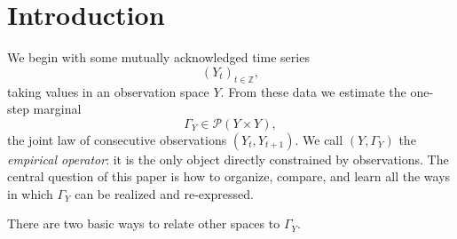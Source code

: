 \documentclass[11pt]{article}
\newcommand{\1}{\mathbf{1}}
\begin{document}
\begin{abstract}
We show that Csiszár--Amari $\alpha$-divergences supply a principled, philosophically interpretable family of global discrepancy measures: forward KL ($\alpha=+1$) emphasizes empirical transport unexplained by a model, reverse KL ($\alpha=-1$) emphasizes model transport unsupported by data, and symmetric regimes ($\alpha\approx 0$) emphasize structural overlap. Crucially, these choices share a common zero set and induce (up to scale) the same Fisher metric, so the Rose condition, IG leaves, and geometric separability remain \emph{stance-neutral} structural tests, while $\alpha$ acts as an empirical lens determining which approximate mismatches matter.

Operationally, we give an operator-learning pipeline: estimate $\Gamma_Y$ from time series; fit model stepwise marginals $\Gamma_Z$; minimize divergence as an edge action with bootstrap uncertainty; compute pullback dualistic structures and assess separability across chosen cuts; and extract locality and learning exponents $(\eta,\zeta)$ that reveal effective smoothness and dimensionality. 

Conceptually, the framework unifies reconstruction, inference, and geometry within a single transport object. It accommodates constructive-empiricist, scientific-realist, and structural-realist readings as different decompositions of the same observational content, while allowing empirical information geometry (in particular the IG leaf structure and intrinsic coupling across cuts) to determine which decompositions are statistically and geometrically admissible.
\end{abstract}

\section{Introduction}

We begin with some mutually acknowledged time series
\[
  (Y_t)_{t\in\mathbb{Z}},
\]
taking values in an observation space $Y$. From these data we estimate the one-step marginal
\[
  \Gamma_Y \in \mathcal P(Y\times Y),
\]
the joint law of consecutive observations $(Y_t,Y_{t+1})$. We call $(Y,\Gamma_Y)$ the \emph{empirical operator}: it is the only object directly constrained by observations. The central question of this paper is how to organize, compare, and learn all the ways in which $\Gamma_Y$ can be realized and re-expressed.

There are two basic ways to relate other spaces to $\Gamma_Y$.
\end{document}
